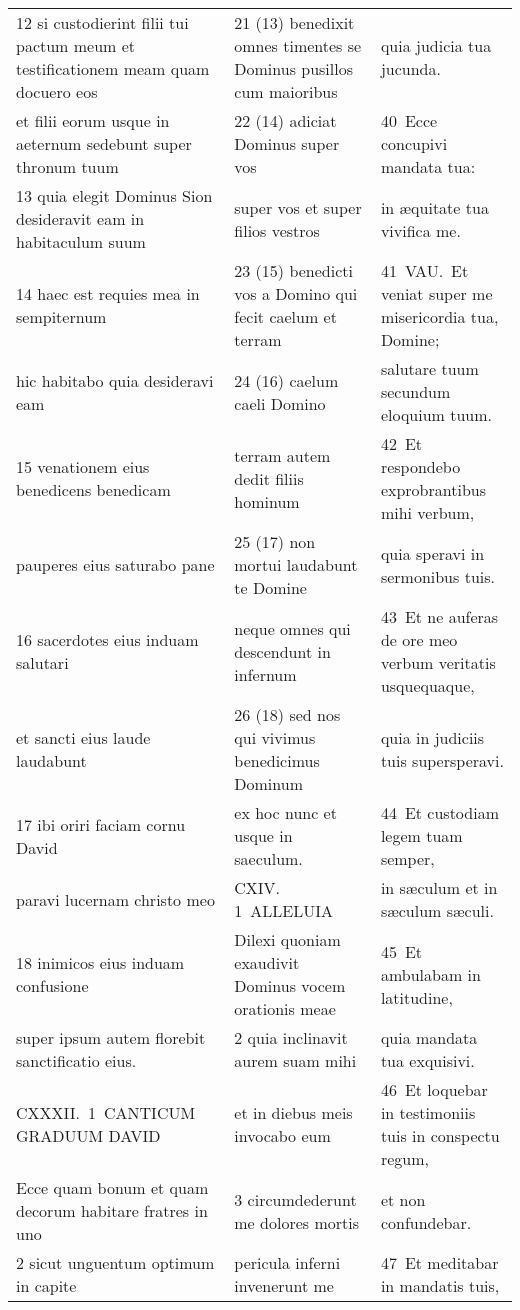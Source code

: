 \documentclass{article}
\begin{document}
\begin{longtable}{@{}p{}p{}p{}@{}}
12 si custodierint filii tui pactum meum et testificationem meam quam docuero eos	&	21 (13) benedixit omnes timentes se Dominus pusillos cum maioribus	&	quia judicia tua jucunda.	\\
et filii eorum usque in aeternum sedebunt super thronum tuum	&	22 (14) adiciat Dominus super vos	&	40 Ecce concupivi mandata tua:	\\
13 quia elegit Dominus Sion desideravit eam in habitaculum suum	&	super vos et super filios vestros	&	in æquitate tua vivifica me.	\\
14 haec est requies mea in sempiternum	&	23 (15) benedicti vos a Domino qui fecit caelum et terram	&	41 VAU. Et veniat super me misericordia tua, Domine;	\\
hic habitabo quia desideravi eam	&	24 (16) caelum caeli Domino	&	salutare tuum secundum eloquium tuum.	\\
15 venationem eius benedicens benedicam	&	terram autem dedit filiis hominum	&	42 Et respondebo exprobrantibus mihi verbum,	\\
pauperes eius saturabo pane	&	25 (17) non mortui laudabunt te Domine	&	quia speravi in sermonibus tuis.	\\
16 sacerdotes eius induam salutari	&	neque omnes qui descendunt in infernum	&	43 Et ne auferas de ore meo verbum veritatis usquequaque,	\\
et sancti eius laude laudabunt	&	26 (18) sed nos qui vivimus benedicimus Dominum	&	quia in judiciis tuis supersperavi.	\\
17 ibi oriri faciam cornu David	&	ex hoc nunc et usque in saeculum.	&	44 Et custodiam legem tuam semper,	\\
paravi lucernam christo meo	&	CXIV. 1 ALLELUIA	&	in sæculum et in sæculum sæculi.	\\
18 inimicos eius induam confusione	&	Dilexi quoniam exaudivit Dominus vocem orationis meae	&	45 Et ambulabam in latitudine,	\\
super ipsum autem florebit sanctificatio eius.	&	2 quia inclinavit aurem suam mihi	&	quia mandata tua exquisivi.	\\
CXXXII. 1 CANTICUM GRADUUM DAVID	&	et in diebus meis invocabo eum	&	46 Et loquebar in testimoniis tuis in conspectu regum,	\\
Ecce quam bonum et quam decorum habitare fratres in uno	&	3 circumdederunt me dolores mortis	&	et non confundebar.	\\
2 sicut unguentum optimum in capite	&	pericula inferni invenerunt me	&	47 Et meditabar in mandatis tuis,	\\

\end{longtable}
\end{document}
